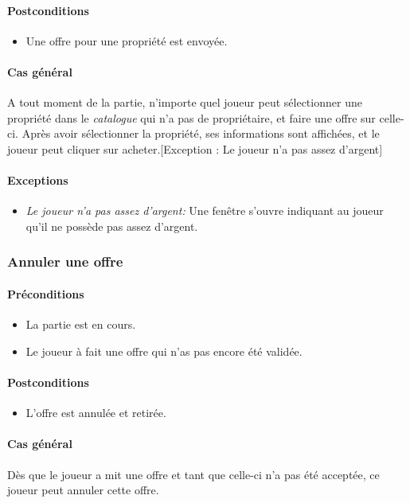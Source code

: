 \documentclass[a4paper,11pt]{report}
\begin{document}
\paragraph{Postconditions}
\begin{itemize}
 \item Une offre pour une propriété est envoyée.
\end{itemize}
\paragraph{Cas général}
A tout moment de la partie, n'importe quel joueur peut sélectionner une propriété dans le \textit{catalogue} qui n'a pas de propriétaire, et faire une offre sur celle-ci. Après avoir sélectionner la propriété, ses informations sont affichées, et le joueur peut cliquer sur acheter.[Exception : Le joueur n'a pas assez d'argent]
\paragraph{Exceptions}
\begin{itemize}
 \item \textit{Le joueur n'a pas assez d'argent:} Une fenêtre s'ouvre indiquant au joueur qu'il ne possède pas assez d'argent.
\end{itemize}

\subsubsection{Annuler une offre}
\paragraph{Préconditions}
\begin{itemize}
 \item La partie est en cours.
 \item Le joueur à fait une offre qui n'as pas encore été validée.
\end{itemize}
\paragraph{Postconditions}
\begin{itemize}
 \item L'offre est annulée et retirée.
\end{itemize}
\paragraph{Cas général}
Dès que le joueur a mit une offre et tant que celle-ci n'a pas été acceptée, ce joueur peut annuler cette offre.
\end{document}
